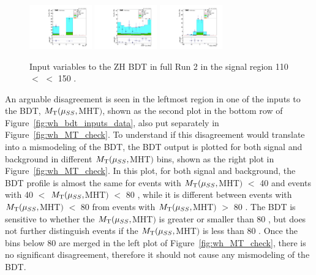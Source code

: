 \begin{figure}[!htb]
  \includegraphics[width=0.24\textwidth]{pics/VH_sec/valid_BDT_ZH/lep_ID.pdf}
  \includegraphics[width=0.24\textwidth]{pics/VH_sec/valid_BDT_ZH/cts_dipair_H.pdf}
  \includegraphics[width=0.24\textwidth]{pics/VH_sec/valid_BDT_ZH/dipair_dEta_H.pdf}
  \caption{Input variables to the ZH BDT in full Run 2 in the signal region 110 \GeV $<$ \mmm $<$ 150 \GeV.}
  \label{fig:zh_bdt_inputs_data}
\end{figure}

An arguable disagreement is seen in the leftmost region in one of the inputs to the \WH BDT, $M_{\mathrm{T}}(\mu_{SS}, $MHT$)$,
shown as the second plot in the bottom row of Figure~\ref{fig:wh_bdt_inputs_data}, also put separately in Figure~\ref{fig:wh_MT_check}. 
To understand if this disagreement would translate into a mismodeling of the \WH BDT, 
the BDT output is plotted for both signal and background in different $M_{\mathrm{T}}(\mu_{SS}, $MHT$)$ bins, 
shown as the right plot in Figure~\ref{fig:wh_MT_check}.
In this plot, for both signal and background, 
the BDT profile is almost the same for events with $M_{\mathrm{T}}(\mu_{SS}, $MHT$)$ $<$ 40 \GeV and events with 40 $<$ $M_{\mathrm{T}}(\mu_{SS}, $MHT$)$ $<$ 80 \GeV,
while it is different between events with $M_{\mathrm{T}}(\mu_{SS}, $MHT$)$ $<$ 80 \GeV from events with $M_{\mathrm{T}}(\mu_{SS}, $MHT$)$ $>$ 80 \GeV.  
The BDT is sensitive to whether the $M_{\mathrm{T}}(\mu_{SS}, $MHT$)$ is greater or smaller than 80 \GeV, 
but does not further distinguish events if the $M_{\mathrm{T}}(\mu_{SS}, $MHT$)$ is less than 80 \GeV.
Once the bins below 80 \GeV are merged in the left plot of Figure~\ref{fig:wh_MT_check}, there is no significant disagreement, 
therefore it should not cause any mismodeling of the BDT.

